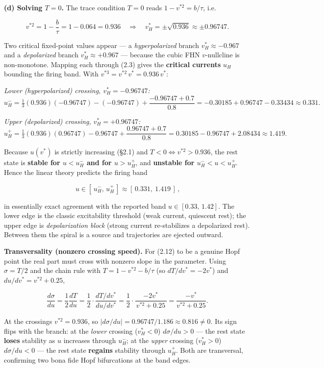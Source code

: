 \documentclass[
  11pt,
]{article}
\providecommand{\lt}{<}
\providecommand{\gt}{>}
\begin{document}
\textbf{(d) Solving \(T=0\).} The trace condition \(T=0\) reads
\(1 - v^{*2} = b/\tau\), i.e.

\[
v^{*2} = 1 - \frac{b}{\tau} = 1 - 0.064 = 0.936
\quad\Longrightarrow\quad
v^*_H = \pm\sqrt{0.936} \approx \pm 0.96747 .
\tag{2.16}
\]

Two critical fixed-point values appear --- a \emph{hyperpolarized}
branch \(v^*_H \approx -0.967\) and a \emph{depolarized} branch
\(v^*_H \approx +0.967\) --- because the cubic FHN \(v\)-nullcline is
non-monotone. Mapping each through (2.3) gives the \textbf{critical
currents} \(u_H\) bounding the firing band. With
\(v^{*3} = v^{*2}\,v^* = 0.936\,v^*\):

\emph{Lower (hyperpolarized) crossing, \(v^*_H = -0.96747\):} \[
u_H^- = \tfrac{1}{3}(0.936)(-0.96747) - (-0.96747) + \frac{-0.96747 + 0.7}{0.8}
= -0.30185 + 0.96747 - 0.33434 \approx 0.331 .
\tag{2.17}
\]

\emph{Upper (depolarized) crossing, \(v^*_H = +0.96747\):} \[
u_H^+ = \tfrac{1}{3}(0.936)(0.96747) - 0.96747 + \frac{0.96747 + 0.7}{0.8}
= 0.30185 - 0.96747 + 2.08434 \approx 1.419 .
\tag{2.18}
\]

Because \(u(v^*)\) is strictly increasing (§2.1) and
\(T\lt 0 \Leftrightarrow v^{*2}\gt 0.936\), the rest state is
\textbf{stable for \(u \lt  u_H^-\) and for \(u \gt  u_H^+\)}, and
\textbf{unstable for \(u_H^- \lt  u \lt  u_H^+\)}. Hence the linear
theory predicts the firing band

\[
\boxed{\,u \in [\,u_H^-,\,u_H^+\,] \approx [\,0.331,\ 1.419\,]\,},
\tag{2.19}
\]

in essentially exact agreement with the reported band
\(u \in [0.33,\,1.42]\). The lower edge is the classic excitability
threshold (weak current, quiescent rest); the upper edge is
\emph{depolarization block} (strong current re-stabilizes a depolarized
rest). Between them the spiral is a source and trajectories are ejected
outward.

\textbf{Transversality (nonzero crossing speed).} For (2.12) to be a
genuine Hopf point the real part must cross with nonzero slope in the
parameter. Using \(\sigma = T/2\) and the chain rule with
\(T = 1 - v^{*2} - b/\tau\) (so \(dT/dv^* = -2v^*\)) and
\(du/dv^* = v^{*2}+0.25\),

\[
\frac{d\sigma}{du} = \frac{1}{2}\frac{dT}{du}
= \frac{1}{2}\cdot\frac{dT/dv^*}{du/dv^*}
= \frac{1}{2}\cdot\frac{-2v^*}{\,v^{*2}+0.25\,}
= \frac{-v^*}{v^{*2}+0.25}.
\tag{2.20}
\]

At the crossings \(v^{*2}=0.936\), so
\(\big|d\sigma/du\big| = 0.96747/1.186 \approx 0.816 \ne 0\). Its sign
flips with the branch: at the \emph{lower} crossing (\(v^*_H\lt 0\))
\(d\sigma/du \gt  0\) --- the rest state \textbf{loses} stability as
\(u\) increases through \(u_H^-\); at the \emph{upper} crossing
(\(v^*_H\gt 0\)) \(d\sigma/du \lt  0\) --- the rest state
\textbf{regains} stability through \(u_H^+\). Both are transversal,
confirming two bona fide Hopf bifurcations at the band edges.
\end{document}
